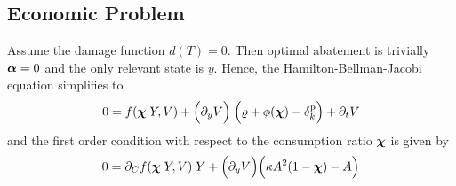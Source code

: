 \documentclass[../../main.tex]{subfiles}
\begin{document}
\subsection{Economic Problem}

Assume the damage function $d(T) = 0$. Then optimal abatement is trivially $\bm{\alpha} = 0$ and the only relevant state is $y$. Hence, the Hamilton-Bellman-Jacobi equation simplifies to \begin{equation}
    0 = f(\bm{\chi} \; Y, V) + \Big(\partial_{y} V \Big) \;  \Big(\varrho + \phi(\bm{\chi}) - \delta^{\mathrm{p}}_k \Big) + \partial_t V
\end{equation} and the first order condition with respect to the consumption ratio $\bm{\chi}$ is given by \begin{equation}
    0 = \partial_C f(\bm{\chi} \; Y, V) \; Y + \Big(\partial_{y} V \Big) \Big( \kappa A^2 (1 - \bm{\chi}) - A \Big)
\end{equation}
\end{document}
